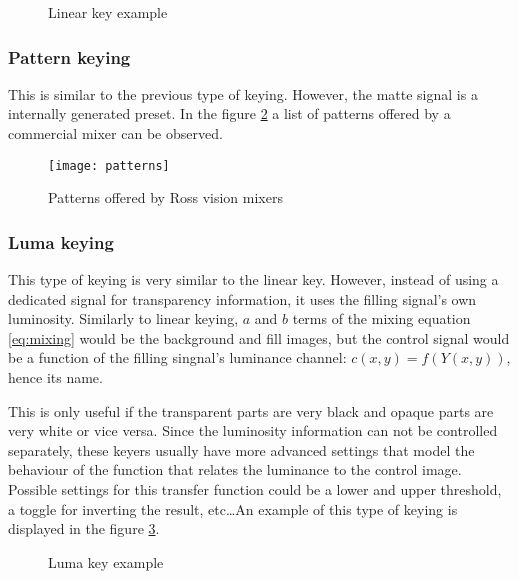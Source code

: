 \documentclass[../main.tex]{subfiles}
\begin{document}
\begin{figure}[htbp]
    \centering

    \caption{Linear key example}
    \label{fig:02:linear_key_example}
\end{figure}

\subsubsection{Pattern keying}
This is similar to the previous type of keying. However, the matte signal is a internally generated preset. In the figure \ref{fig:02:patterns} a list of patterns offered by a commercial mixer can be observed.\newline

\begin{figure}[htbp]
    \centering
    \texttt{[image: patterns]}
    \caption{Patterns offered by Ross vision mixers}
    \label{fig:02:patterns}
\end{figure}

\subsubsection{Luma keying}
This type of keying is very similar to the linear key. However, instead of using a dedicated signal for transparency information, it uses the filling signal's own luminosity. Similarly to linear keying, $a$ and $b$ terms of the mixing equation \eqref{eq:mixing} would be the background and fill images, but the control signal would be a function of the filling singnal's luminance channel: $c(x, y) = f(Y(x, y))$, hence its name.\newline

This is only useful if the transparent parts are very black and opaque parts are very white or vice versa. Since the luminosity information can not be controlled separately, these keyers usually have more advanced settings that model the behaviour of the function that relates the luminance to the control image. Possible settings for this transfer function could be a lower and upper threshold, a toggle for inverting the result, etc\dots An example of this type of keying is displayed in the figure \ref{fig:02:luma_key_example}.

\begin{figure}[htbp]
    \centering

    \caption{Luma key example}
    \label{fig:02:luma_key_example}
\end{figure}
\end{document}
